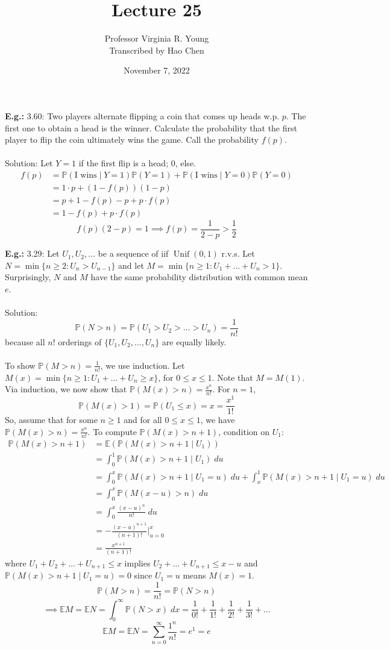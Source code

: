 \documentclass[a4paper]{article}
\title{Lecture 25}
\author{Professor Virginia R. Young\\ \small{Transcribed by Hao Chen}}
\date{November 7, 2022}
\newcommand{\n}{\hfill\break}
\newcommand{\eg}[1]{\par\noindent\settowidth{\hangindent}{\textbf{E.g.: }}\textbf{E.g.: }#1\n}
\newcommand{\Prob}{\mathbb{P}}
\renewcommand{\P}{\Prob}
\newcommand{\Avg}{\mathbb{E}}
\newcommand{\E}{\Avg}
\DeclareMathOperator{\Unif}{Unif}
\begin{document}
\maketitle

\eg{
    3.60: Two players alternate flipping a coin that comes up heads w.p. $p$. The first one to obtain a head is the winner. Calculate the probability that the first player to flip the coin ultimately wins the game. Call the probability $f(p)$.
    \\\\
    Solution: Let $Y=1$ if the first flip is a head; 0, else.
    \begin{align*}
        f(p)&=\P(\text{I wins}\mid Y=1)\P(Y=1)+\P(\text{I wins}\mid Y=0)\P(Y=0) \\
        &=1\cdot p+(1-f(p))(1-p) \\
        &=p+1-f(p)-p+p\cdot f(p) \\
        &=1-f(p)+p\cdot f(p)
    \end{align*}
    \[f(p)(2-p)=1 \implies f(p)=\frac{1}{2-p}>\frac{1}{2}\]
}

\eg{
    3.29: Let $U_1, U_2, \dots$ be a sequence of iif $\Unif(0,1)$ r.v.s. Let $N=\min\{n\geq2:U_n>U_{n-1}\}$ and let $M=\min\{n\geq1:U_1+\dots+U_n>1\}$. Surprisingly, $N$ and $M$ have the same probability distribution with common mean $e$.
    \\\\
    Solution:
    \[\P(N>n)=\P(U_1>U_2>\dots>U_n)=\frac{1}{n!}\]
    because all $n!$ orderings of $\{U_1,U_2,\dots,U_n\}$ are equally likely.
    \\\\
    To show $\P(M>n)=\frac{1}{n!}$, we use induction. Let $M(x)=\min\{n\geq1: U_1+\dots+U_n\geq x\}$, for $0\leq x\leq1$. Note that $M=M(1)$. Via induction, we now show that $\P(M(x)> n)=\frac{x^n}{n!}$. For $n=1$, 
    \[\P(M(x)>1)=\P(U_1\leq x)=x=\frac{x^1}{1!}\]
    So, assume that for some $n\geq1$ and for all $0\leq x\leq 1$, we have $\P(M(x)>n)=\frac{x^n}{n!}$. To compute $\P(M(x)>n+1)$, condition on $U_1$:
    \begin{align*}
        \P(M(x)>n+1)&=\E(\P(M(x)>n+1\mid U_1)) \\
        &=\int^1_0 \P(M(x)>n+1\mid U_1)\;du \\
        &=\int^x_0\P(M(x)>n+1\mid U_1=u)\;du+\int^1_x\P(M(x)>n+1\mid U_1=u)\;du \\
        &=\int^x_0\P(M(x-u)>n)\;du \\
        &=\int^x_0\frac{(x-u)^n}{n!}\;du \\
        &=-\frac{(x-u)^{n+1}}{(n+1)!}\bigg\vert^x_{u=0} \\
        &=\frac{x^{n+1}}{(n+1)!}
    \end{align*}
    where $U_1+U_2+\dots+U_{n+1}\leq x$ implies $U_2+\dots+U_{n+1}\leq x-u$ and $\P(M(x)>n+1\mid U_1=u)=0$ since $U_1=u$ means $M(x)=1$.
    \[\P(M>n)=\frac{1}{n!}=\P(N>n)\]
    \[\implies \E M=\E N=\int^\infty_0\P(N>x)\;dx=\frac{1}{0!}+\frac{1}{1!}+\frac{1}{2!}+\frac{1}{3!}+\dots\]
    \[\E M=\E N = \sum^\infty_{n=0}\frac{1^n}{n!}=e^1=e\]
}
\end{document}
